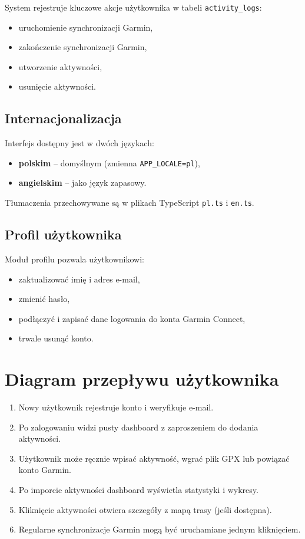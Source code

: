 \documentclass[12pt,a4paper]{report}
\begin{document}
System rejestruje kluczowe akcje użytkownika w tabeli \texttt{activity\_logs}:
\begin{itemize}[noitemsep]
    \item uruchomienie synchronizacji Garmin,
    \item zakończenie synchronizacji Garmin,
    \item utworzenie aktywności,
    \item usunięcie aktywności.
\end{itemize}

\subsection{Internacjonalizacja}

Interfejs dostępny jest w dwóch językach:
\begin{itemize}[noitemsep]
    \item \textbf{polskim} -- domyślnym (zmienna \texttt{APP\_LOCALE=pl}),
    \item \textbf{angielskim} -- jako język zapasowy.
\end{itemize}
Tłumaczenia przechowywane są w plikach TypeScript \texttt{pl.ts} i \texttt{en.ts}.

\subsection{Profil użytkownika}

Moduł profilu pozwala użytkownikowi:
\begin{itemize}[noitemsep]
    \item zaktualizować imię i adres e-mail,
    \item zmienić hasło,
    \item podłączyć i zapisać dane logowania do konta Garmin Connect,
    \item trwale usunąć konto.
\end{itemize}

\section{Diagram przepływu użytkownika}

\begin{enumerate}
    \item Nowy użytkownik rejestruje konto i weryfikuje e-mail.
    \item Po zalogowaniu widzi pusty dashboard z zaproszeniem do dodania aktywności.
    \item Użytkownik może ręcznie wpisać aktywność, wgrać plik GPX lub powiązać konto Garmin.
    \item Po imporcie aktywności dashboard wyświetla statystyki i wykresy.
    \item Kliknięcie aktywności otwiera szczegóły z mapą trasy (jeśli dostępna).
    \item Regularne synchronizacje Garmin mogą być uruchamiane jednym kliknięciem.
\end{enumerate}
\end{document}

